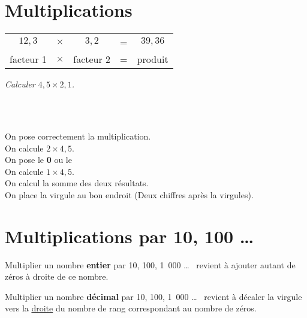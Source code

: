\documentclass[11pt]{article}
\begin{document}
\section{Multiplications}

\begin{rappel}
\begin{tabular}{ccccc}
$12,3$&$\times$&$3,2$&=&$39,36$ \\
facteur 1& $\times$ & facteur 2& = & produit \\
\end{tabular}
\end{rappel}

\begin{exercicedevoir}[0]
\textit{Calculer $4,5 \times 2,1$.}
\end{exercicedevoir}

\begin{multicols}{2}
\hfill{}\hfill \hfill \\ \\

\columnbreak

 On pose correctement la multiplication. \\
 On calcule $2 \times 4,5$. \\
 On pose le \textbf{0} ou le \textbullet \\
 On calcule $1 \times 4,5$. \\
 On calcul la somme des deux résultats. \\
 On place la virgule au bon endroit (Deux chiffres après la virgules).
\end{multicols}
\section{Multiplications par 10, 100 \ldots}

\begin{propriete}
Multiplier un nombre \textbf{entier} par 10, 100, 1~000 \ldots ~
revient à ajouter autant de zéros à droite de ce nombre.
\end{propriete}

\begin{propriete}
Multiplier un nombre \textbf{décimal} par 10, 100, 1~000 \ldots ~
revient à décaler la virgule vers la \underline{droite} du nombre de
rang correspondant au nombre de zéros.
\end{propriete}
\end{document}
